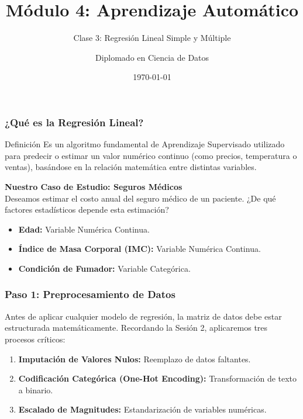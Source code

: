 \documentclass{beamer}
\title[Regresión Lineal]{Módulo 4: Aprendizaje Automático}
\subtitle{Clase 3: Regresión Lineal Simple y Múltiple}
\author{Diplomado en Ciencia de Datos}
\date{\today}
\begin{document}
\frame{\titlepage}

\begin{frame}
\frametitle{¿Qué es la Regresión Lineal?}
\begin{block}{Definición}
Es un algoritmo fundamental de Aprendizaje Supervisado utilizado para predecir o estimar un valor numérico continuo (como precios, temperatura o ventas), basándose en la relación matemática entre distintas variables.
\end{block}
\vspace{0.3cm}
\textbf{Nuestro Caso de Estudio: Seguros Médicos}\\
Deseamos estimar el costo anual del seguro médico de un paciente. ¿De qué factores estadísticos depende esta estimación?
\begin{itemize}
    \item \textbf{Edad:} Variable Numérica Continua.
    \item \textbf{Índice de Masa Corporal (IMC):} Variable Numérica Continua.
    \item \textbf{Condición de Fumador:} Variable Categórica.
\end{itemize}
\end{frame}

\begin{frame}
\frametitle{Paso 1: Preprocesamiento de Datos}
Antes de aplicar cualquier modelo de regresión, la matriz de datos debe estar estructurada matemáticamente. Recordando la Sesión 2, aplicaremos tres procesos críticos:
\vspace{0.3cm}
\begin{enumerate}
    \item \textbf{Imputación de Valores Nulos:} Reemplazo de datos faltantes.
    \item \textbf{Codificación Categórica (One-Hot Encoding):} Transformación de texto a binario.
    \item \textbf{Escalado de Magnitudes:} Estandarización de variables numéricas.
\end{enumerate}
\end{frame}
\end{document}
